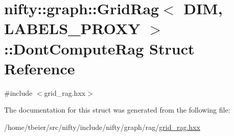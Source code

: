 \hypertarget{structnifty_1_1graph_1_1GridRag_1_1DontComputeRag}{}\section{nifty\+:\+:graph\+:\+:Grid\+Rag$<$ D\+I\+M, L\+A\+B\+E\+L\+S\+\_\+\+P\+R\+O\+X\+Y $>$\+:\+:Dont\+Compute\+Rag Struct Reference}
\label{structnifty_1_1graph_1_1GridRag_1_1DontComputeRag}


{\ttfamily \#include $<$grid\+\_\+rag.\+hxx$>$}



The documentation for this struct was generated from the following file\+:\begin{DoxyCompactItemize}
\item 
/home/tbeier/src/nifty/include/nifty/graph/rag/\hyperlink{grid__rag_8hxx}{grid\+\_\+rag.\+hxx}\end{DoxyCompactItemize}
